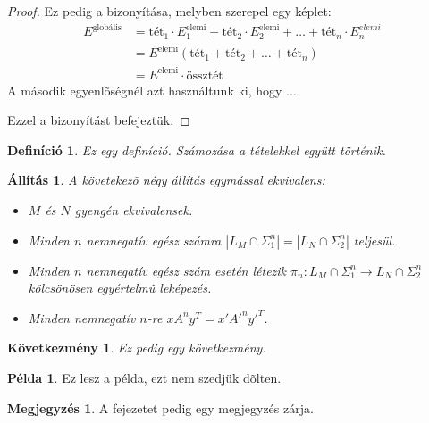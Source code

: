 \documentclass[12pt]{report}
\newtheorem{defi}[tét]{Definíció}
\newtheorem{áll}[tét]{Állítás}
\newtheorem{köv}[tét]{Következmény}
\theoremstyle{definition}
\newtheorem{megj}[tét]{Megjegyzés}
\newtheorem{pld}[tét]{Példa}
\begin{document}
\begin{proof}
Ez pedig a bizonyítása, melyben szerepel egy képlet:
\begin{equation}
\begin{split}
E^{\text{globális}} &= \text{tét}_1\cdot E_1^{\text{elemi}}+\text{tét}_2\cdot
E_2^{\text{elemi}}+\ldots+\text{tét}_n\cdot E_n^{elemi} \\
&=E^{\text{elemi}}\left(\text{tét}_1+\text{tét}_2+\ldots+\text{tét}_n\right)\\
&=E^{\text{elemi}}\cdot\text{össztét}
\end{split}
\end{equation}
A második egyenlõségnél azt használtunk ki, hogy ...

Ezzel a bizonyítást befejeztük.
\end{proof}

\begin{defi}
\label{def-pelda}
Ez egy definíció. Számozása a tételekkel együtt történik.
\end{defi}

\begin{áll}
A követekezõ négy állítás egymással ekvivalens:
\label{áll-ekvivalencia}
  \begin{itemize}
  \item[(i)] $M$ és $N$ gyengén ekvivalensek.
  \item[(ii)] Minden $n$
  nemnegatív egész számra $|L_{M}\cap \Sigma_{1}^{n}|=|L_{N}\cap \Sigma_{2}^{n}|$ teljesül.
  \item[(iii)] Minden $n$ nemnegatív egész szám esetén
   létezik
  $ \pi_{n}: L_{M}\cap \Sigma_{1}^{n} \rightarrow L_{N}\cap \Sigma_{2}^{n} $ kölcsönösen egyértelmû
  leképezés.
  \item[(iv)] Minden nemnegatív $n$-re $x A^{n} y^{T}=x' A'^{n} y'^{T}$.
  \end{itemize}
\end{áll}

\begin{köv}
  Ez pedig egy következmény.
\end{köv}

\begin{pld}
  Ez lesz a példa, ezt nem szedjük dõlten.
\end{pld}

\begin{megj}
  A fejezetet pedig egy megjegyzés zárja.
\end{megj}
\end{document}
